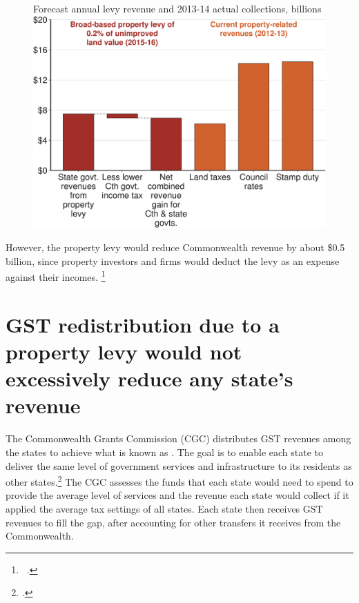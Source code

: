 \documentclass[twoside,english]{Dianab5ona4portrait}
\begin{document}
\begin{figure}
%
{Forecast annual levy revenue and 2013-14 actual collections, billions}
\includegraphics[width=\columnwidth]{Property-taxes/atlas/figure/Figure5-1.pdf}

\end{figure} 

However, the property levy would reduce Commonwealth revenue by about \$0.5 billion, since property investors and firms would deduct the levy as an expense against their incomes.%
\footnote{\gao\ \textcites{ABS2013t}{ATOmultipleyears}{ABS2014k}.}

\section{\label{sec:PROP-3-4}GST redistribution due to a property levy would not excessively reduce any state’s revenue}
The Commonwealth Grants Commission (CGC) distributes GST revenues among the states to achieve what is known as . The goal is to enable each state to deliver the same level of government services and infrastructure to its residents as other states.\footcite[][1]{CGC2015}  The CGC assesses the funds that each state would need to spend to provide the average level of services and the revenue each state would collect if it applied the average tax settings of all states. Each state then receives GST revenues to fill the gap, after accounting for other transfers it receives from the Commonwealth. 
\end{document}
